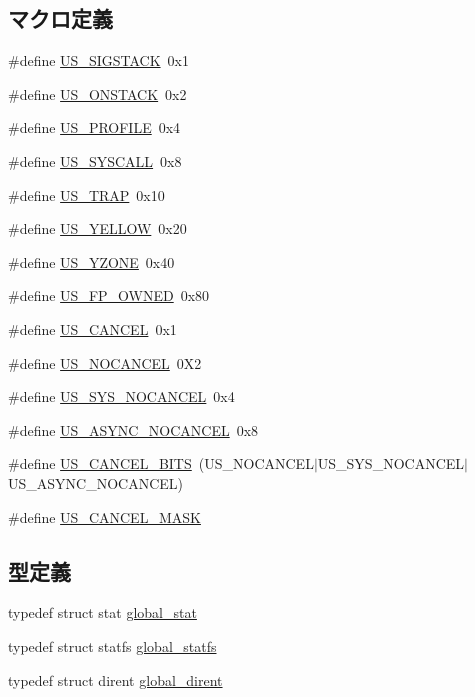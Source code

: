 \subsection*{マクロ定義}
\begin{DoxyCompactItemize}
\item 
\#define \hyperlink{kern_2tru64_2tru64_8hh_ac24e0f8db00c21320591c78141f02db3}{US\_\-SIGSTACK}~0x1
\item 
\#define \hyperlink{kern_2tru64_2tru64_8hh_a4e9bea1f0bf5eaa0a3de4cf4f96fb703}{US\_\-ONSTACK}~0x2
\item 
\#define \hyperlink{kern_2tru64_2tru64_8hh_a8e6cbedf17c907260a68ba151e334beb}{US\_\-PROFILE}~0x4
\item 
\#define \hyperlink{kern_2tru64_2tru64_8hh_a05dc14b0b6e83cebfc7e62a67b99a5b6}{US\_\-SYSCALL}~0x8
\item 
\#define \hyperlink{kern_2tru64_2tru64_8hh_a464d91849cd67867458ccb546abccb3f}{US\_\-TRAP}~0x10
\item 
\#define \hyperlink{kern_2tru64_2tru64_8hh_a689c6ea145e701718abb3b2a4dc8c519}{US\_\-YELLOW}~0x20
\item 
\#define \hyperlink{kern_2tru64_2tru64_8hh_add5a5fbe7fe7caed1b149f2a608af2e2}{US\_\-YZONE}~0x40
\item 
\#define \hyperlink{kern_2tru64_2tru64_8hh_aa03cff48983215334518b8b1520a8430}{US\_\-FP\_\-OWNED}~0x80
\item 
\#define \hyperlink{kern_2tru64_2tru64_8hh_a3ee52ec290fe142e43267b7bc43dc2f1}{US\_\-CANCEL}~0x1
\item 
\#define \hyperlink{kern_2tru64_2tru64_8hh_a819fb2af3c0a9d945735a98248d1a983}{US\_\-NOCANCEL}~0X2
\item 
\#define \hyperlink{kern_2tru64_2tru64_8hh_abe6a60485e6bd345b1a3c98d2a3c5d3f}{US\_\-SYS\_\-NOCANCEL}~0x4
\item 
\#define \hyperlink{kern_2tru64_2tru64_8hh_a8fb59dd3e825f2e645ccd2708ec6153c}{US\_\-ASYNC\_\-NOCANCEL}~0x8
\item 
\#define \hyperlink{kern_2tru64_2tru64_8hh_aff7376b113f465e1313234392ac9a49a}{US\_\-CANCEL\_\-BITS}~(US\_\-NOCANCEL$|$US\_\-SYS\_\-NOCANCEL$|$US\_\-ASYNC\_\-NOCANCEL)
\item 
\#define \hyperlink{kern_2tru64_2tru64_8hh_a346c9edb572174f9be6d764ea22df611}{US\_\-CANCEL\_\-MASK}
\end{DoxyCompactItemize}
\subsection*{型定義}
\begin{DoxyCompactItemize}
\item 
typedef struct stat \hyperlink{kern_2tru64_2tru64_8hh_a38e9c9050f8ef6245f3e4e2cdb25ae18}{global\_\-stat}
\item 
typedef struct statfs \hyperlink{kern_2tru64_2tru64_8hh_a1a8529336c3f2704cb49ee2cd97412a8}{global\_\-statfs}
\item 
typedef struct dirent \hyperlink{kern_2tru64_2tru64_8hh_ae8a7ba972c525e3d137846c7f1d0a1d5}{global\_\-dirent}
\end{DoxyCompactItemize}


